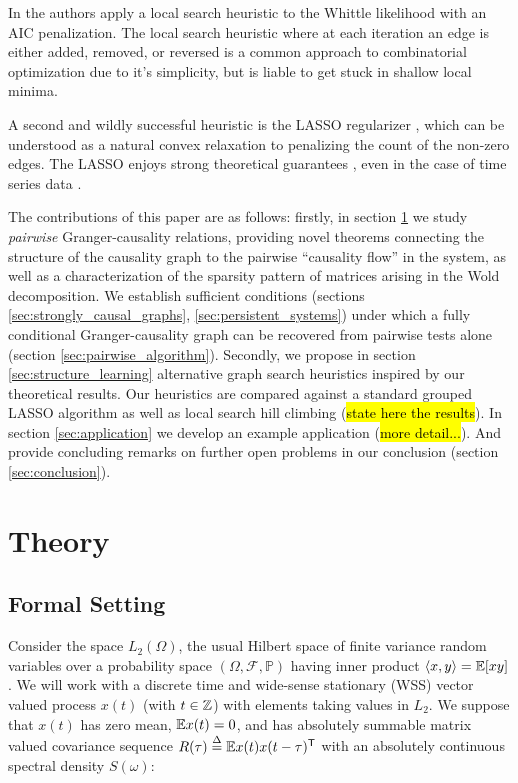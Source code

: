 \documentclass[12pt]{article}
\begin{document}
In \cite{bach2004learning} the authors apply a local search heuristic
to the Whittle likelihood with an AIC penalization.  The local search
heuristic where at each iteration an edge is either added, removed, or
reversed is a common approach to combinatorial optimization due to
it's simplicity, but is liable to get stuck in shallow local minima.

A second and wildly successful heuristic is the LASSO regularizer
\cite{tibshirani1996regression}, which can be understood as a natural
convex relaxation to penalizing the count of the non-zero edges.  The
LASSO enjoys strong theoretical guarantees \cite{wainwright2009sharp},
even in the case of time series data \cite{basu2015}
\cite{wong2016lasso}.

The contributions of this paper are as follows: firstly, in section
\ref{sec:theory} we study \textit{pairwise} Granger-causality
relations, providing novel theorems connecting the structure of the
causality graph to the pairwise ``causality flow'' in the system, as
well as a characterization of the sparsity pattern of matrices arising
in the Wold decomposition.  We establish sufficient conditions
(sections \ref{sec:strongly_causal_graphs},
\ref{sec:persistent_systems}) under which a fully conditional
Granger-causality graph can be recovered from pairwise tests alone
(section \ref{sec:pairwise_algorithm}).  Secondly, we propose in
section \ref{sec:structure_learning} alternative graph search
heuristics inspired by our theoretical results.  Our heuristics are
compared against a standard grouped LASSO algorithm
\cite{yuan2006model} as well as local search hill climbing (\hl{state
  here the results}).  In section \ref{sec:application} we develop an
example application (\hl{more detail...}).  And provide concluding
remarks on further open problems in our conclusion (section
\ref{sec:conclusion}).


\section{Theory}
\label{sec:theory}
\subsection{Formal Setting}
Consider the space $L_2(\Omega)$, the usual Hilbert space of finite
variance random variables over a probability space
$(\Omega, \mathcal{F}, \mathbb{P})$ having inner product
$\langle x, y \rangle = \mathbb{E}[xy]$.  We will work with a discrete time and
wide-sense stationary (WSS) vector valued process $x(t)$ (with
$t \in \mathbb{Z}$) with elements taking values in $L_2$.  We suppose that
$x(t)$ has zero mean, $\mathbb{E} x(t) = 0$, and has absolutely summable
matrix valued covariance sequence
$R(\tau) \overset{\Delta}{=} \mathbb{E} x(t)x(t - \tau)^{\mathsf{T}}$ with an absolutely
continuous spectral density $S(\omega)$:
\end{document}
